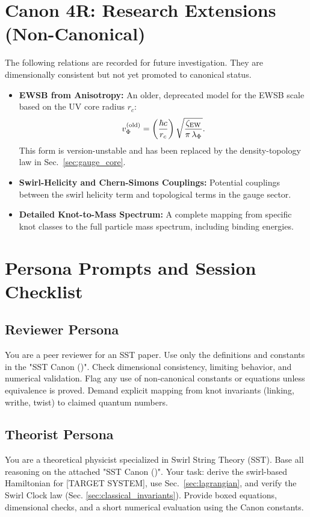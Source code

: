 \documentclass[11pt]{article}
\newcommand{\rc}{r_c}                                    %
\begin{document}
\section{Canon 4R: Research Extensions (Non-Canonical)}
The following relations are recorded for future investigation. They are dimensionally consistent but not yet promoted to canonical status.
\begin{itemize}
\item \textbf{EWSB from Anisotropy:} An older, deprecated model for the EWSB scale based on the UV core radius $\rc$:
\[ v_\Phi^{(\text{old})} = \left(\frac{\hbar c}{\rc}\right) \sqrt{\frac{\zeta_{\rm EW}}{\pi\,\lambda_\Phi}}. \]
This form is version-unstable and has been replaced by the density-topology law in Sec.~\ref{sec:gauge_core}.
\item \textbf{Swirl-Helicity and Chern-Simons Couplings:} Potential couplings between the swirl helicity term and topological terms in the gauge sector.
\item \textbf{Detailed Knot-to-Mass Spectrum:} A complete mapping from specific knot classes to the full particle mass spectrum, including binding energies.
\end{itemize}


\section{Persona Prompts and Session Checklist}
\subsection*{Reviewer Persona}
    \scriptsize
    You are a peer reviewer for an SST paper. Use only the definitions and constants in the "SST Canon (\canonversion)".
    Check dimensional consistency, limiting behavior, and numerical validation. Flag any use of non-canonical
    constants or equations unless equivalence is proved. Demand explicit mapping from knot invariants (linking,
    writhe, twist) to claimed quantum numbers.

\subsection*{Theorist Persona}
    You are a theoretical physicist specialized in Swirl String Theory (SST). Base all reasoning on the attached
    "SST Canon (\canonversion)". Your task: derive the swirl-based Hamiltonian for [TARGET SYSTEM], use Sec.~\ref{sec:lagrangian},
    and verify the Swirl Clock law (Sec. \ref{sec:classical_invariants}). Provide boxed equations, dimensional checks, and a short numerical
    evaluation using the Canon constants.
\end{document}
